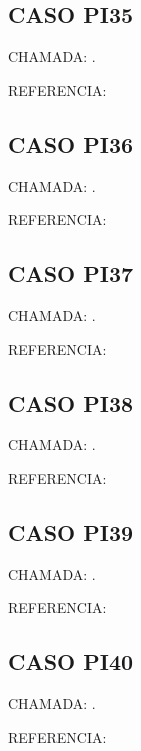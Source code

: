 \documentclass{undftex}
\begin{document}
\begin{refsection}\section*{CASO PI35} CHAMADA: . \textcite{pi35}\par REFERENCIA:\par\printbibliography[heading=none,check=undfconsultadas]\end{refsection}\clearpage
\begin{refsection}\section*{CASO PI36} CHAMADA: . \textcite{pi36}\par REFERENCIA:\par\printbibliography[heading=none,check=undfconsultadas]\end{refsection}\clearpage
\begin{refsection}\section*{CASO PI37} CHAMADA: . \textcite{pi37}\par REFERENCIA:\par\printbibliography[heading=none,check=undfconsultadas]\end{refsection}\clearpage
\begin{refsection}\section*{CASO PI38} CHAMADA: . \textcite{pi38}\par REFERENCIA:\par\printbibliography[heading=none,check=undfconsultadas]\end{refsection}\clearpage
\begin{refsection}\section*{CASO PI39} CHAMADA: . \textcite{pi39}\par REFERENCIA:\par\printbibliography[heading=none,check=undfconsultadas]\end{refsection}\clearpage
\begin{refsection}\section*{CASO PI40} CHAMADA: . \textcite{pi40}\par REFERENCIA:\par\printbibliography[heading=none,check=undfconsultadas]\end{refsection}\clearpage
\end{document}
